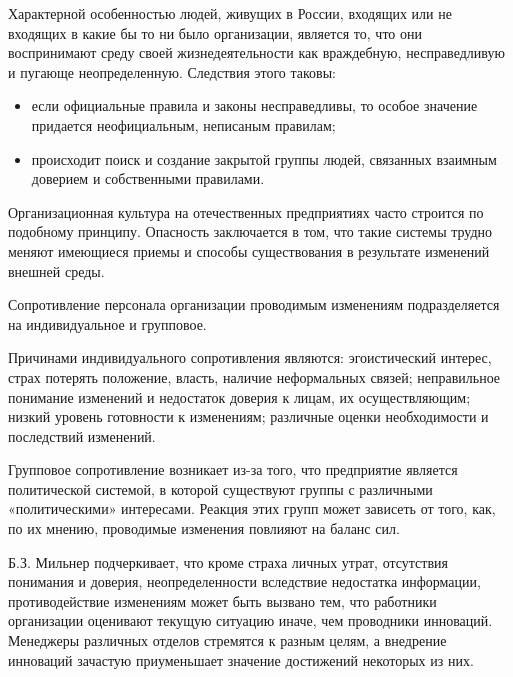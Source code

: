 Характерной особенностью людей, живущих в России, входящих или не входящих в какие бы то ни было организации, является то, что они воспринимают среду своей жизнедеятельности как враждебную, несправедливую и пугающе неопределенную. Следствия этого таковы:
\begin{itemize}
	\item если официальные правила и законы несправедливы, то особое значение придается неофициальным, неписаным правилам;
\item происходит поиск и создание закрытой группы людей, связанных взаимным доверием и собственными правилами.
\end{itemize}

Организационная культура на отечественных предприятиях часто строится по подобному принципу. Опасность заключается в том, что такие системы трудно меняют имеющиеся приемы и способы существования в результате изменений внешней среды.

Сопротивление персонала организации проводимым изменениям подразделяется на индивидуальное и групповое.

Причинами индивидуального сопротивления являются: эгоистический интерес, страх потерять положение, власть, наличие неформальных связей; неправильное понимание изменений и недостаток доверия к лицам, их осуществляющим; низкий уровень готовности к изменениям; различные оценки необходимости и последствий изменений.

Групповое сопротивление возникает из-за того, что предприятие является политической системой, в которой существуют группы с различными «политическими» интересами. Реакция этих групп может зависеть от того, как, по их мнению, проводимые изменения повлияют на баланс сил.

Б.З. Мильнер подчеркивает, что кроме страха личных утрат, отсутствия понимания и доверия, неопределенности вследствие недостатка информации, противодействие изменениям может быть вызвано тем, что работники организации оценивают текущую ситуацию иначе, чем проводники инноваций. Менеджеры различных отделов стремятся к разным целям, а внедрение инноваций зачастую приуменьшает значение достижений некоторых из них.




















